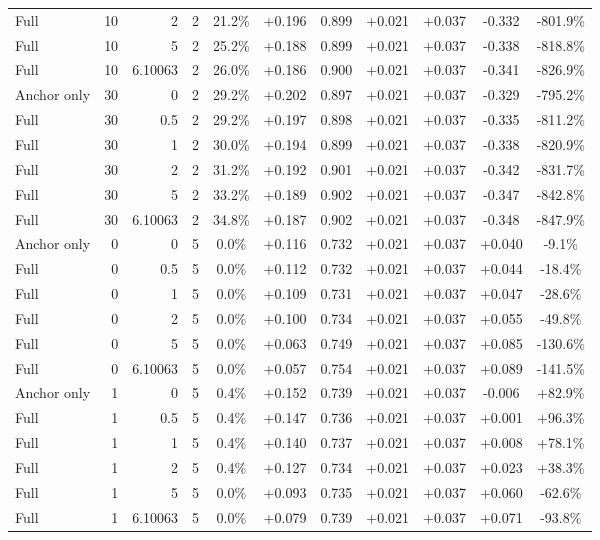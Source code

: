 \begin{table}[htbp]
\begin{tabular}{lrrrccccccc}
Full & 10 & 2 & 2 & 21.2\% & +0.196 & 0.899 & +0.021 & +0.037 & -0.332 & -801.9\% \\
Full & 10 & 5 & 2 & 25.2\% & +0.188 & 0.899 & +0.021 & +0.037 & -0.338 & -818.8\% \\
Full & 10 & 6.10063 & 2 & 26.0\% & +0.186 & 0.900 & +0.021 & +0.037 & -0.341 & -826.9\% \\
Anchor only & 30 & 0 & 2 & 29.2\% & +0.202 & 0.897 & +0.021 & +0.037 & -0.329 & -795.2\% \\
Full & 30 & 0.5 & 2 & 29.2\% & +0.197 & 0.898 & +0.021 & +0.037 & -0.335 & -811.2\% \\
Full & 30 & 1 & 2 & 30.0\% & +0.194 & 0.899 & +0.021 & +0.037 & -0.338 & -820.9\% \\
Full & 30 & 2 & 2 & 31.2\% & +0.192 & 0.901 & +0.021 & +0.037 & -0.342 & -831.7\% \\
Full & 30 & 5 & 2 & 33.2\% & +0.189 & 0.902 & +0.021 & +0.037 & -0.347 & -842.8\% \\
Full & 30 & 6.10063 & 2 & 34.8\% & +0.187 & 0.902 & +0.021 & +0.037 & -0.348 & -847.9\% \\
Anchor only & 0 & 0 & 5 & 0.0\% & +0.116 & 0.732 & +0.021 & +0.037 & +0.040 & -9.1\% \\
Full & 0 & 0.5 & 5 & 0.0\% & +0.112 & 0.732 & +0.021 & +0.037 & +0.044 & -18.4\% \\
Full & 0 & 1 & 5 & 0.0\% & +0.109 & 0.731 & +0.021 & +0.037 & +0.047 & -28.6\% \\
Full & 0 & 2 & 5 & 0.0\% & +0.100 & 0.734 & +0.021 & +0.037 & +0.055 & -49.8\% \\
Full & 0 & 5 & 5 & 0.0\% & +0.063 & 0.749 & +0.021 & +0.037 & +0.085 & -130.6\% \\
Full & 0 & 6.10063 & 5 & 0.0\% & +0.057 & 0.754 & +0.021 & +0.037 & +0.089 & -141.5\% \\
Anchor only & 1 & 0 & 5 & 0.4\% & +0.152 & 0.739 & +0.021 & +0.037 & -0.006 & +82.9\% \\
Full & 1 & 0.5 & 5 & 0.4\% & +0.147 & 0.736 & +0.021 & +0.037 & +0.001 & +96.3\% \\
Full & 1 & 1 & 5 & 0.4\% & +0.140 & 0.737 & +0.021 & +0.037 & +0.008 & +78.1\% \\
Full & 1 & 2 & 5 & 0.4\% & +0.127 & 0.734 & +0.021 & +0.037 & +0.023 & +38.3\% \\
Full & 1 & 5 & 5 & 0.0\% & +0.093 & 0.735 & +0.021 & +0.037 & +0.060 & -62.6\% \\
Full & 1 & 6.10063 & 5 & 0.0\% & +0.079 & 0.739 & +0.021 & +0.037 & +0.071 & -93.8\% \\

\end{tabular}
\end{table}
